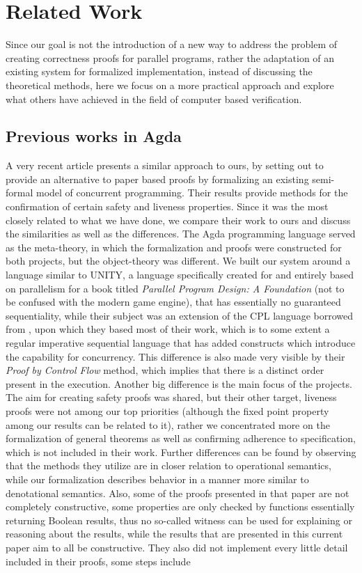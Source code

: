 \chapter{Related Work}
\label{sec:related}

Since our goal is not the introduction of a new way to address the problem of creating correctness proofs for parallel programs, rather the adaptation of an existing system for formalized implementation, instead of discussing the theoretical methods, here we focus on a more practical approach and explore what others have achieved in the field of computer based verification.

\section{Previous works in Agda}
A very recent article \cite{Bergsten2017MethodsFU} presents a similar approach to ours, by setting out to provide an alternative to paper based proofs by formalizing an existing semi-formal model of concurrent programming. Their results provide methods for the confirmation of certain safety and liveness properties. Since it was the most closely related to what we have done, we compare their work to ours and discuss the similarities as well as the differences. The Agda programming language served as the meta-theory, in which the formalization and proofs were constructed for both projects, but the object-theory was different. We built our system around a language similar to UNITY, a language specifically created for and entirely based on parallelism for a book titled \textit{Parallel Program Design: A Foundation}\cite{misra1989foundation} (not to be confused with the modern game engine), that has essentially no guaranteed sequentiality, while their subject was an extension of the CPL language borrowed from \cite{owicki1982proving}, upon which they based most of their work, which is to some extent a regular imperative sequential language that has added constructs which introduce the capability for concurrency. This difference is also made very visible by their \textit{Proof by Control Flow} method, which implies that there is a distinct order present in the execution. Another big difference is the main focus of the projects. The aim for creating safety proofs was shared, but their other target, liveness proofs were not among our top priorities (although the fixed point property among our results can be related to it), rather we concentrated more on the formalization of general theorems as well as confirming adherence to specification, which is not included in their work. Further differences can be found by observing that the methods they utilize are in closer relation to operational semantics, while our formalization describes behavior in a manner more similar to denotational semantics. Also, some of the proofs presented in that paper are not completely constructive, some properties are only checked by functions essentially returning Boolean results, thus no so-called witness can be used for explaining or reasoning about the results, while the results that are presented in this current paper aim to all be constructive. They also did not implement every little detail included in their proofs, some steps include 